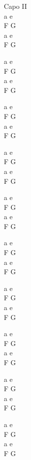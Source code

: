 \hfill
\begin{chord}
    Capo II\\
    a e\\
    F G\\
    a e\\
    F G

    a e\\
    F G\\
    a e\\
    F G
    
    a e\\
    F G\\
    a e\\
    F G

    a e\\
    F G\\
    a e\\
    F G
    
    a e\\
    F G\\
    a e\\
    F G
    
    a e\\
    F G\\
    a e\\
    F G

    a e\\
    F G\\
    a e\\
    F G
    
    a e\\
    F G\\
    a e\\
    F G
    
    a e\\
    F G\\
    a e\\
    F G

    a e\\
    F G\\
    a e\\
    F G
\end{chord}